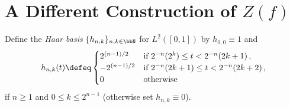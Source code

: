 \documentclass[../../../Master/AppliedStochastics.tex]{subfiles}
\author{Joe}
\date{01 October 2018}
\begin{document}
%


\makelecture


\section{A Different Construction of \texorpdfstring{$Z(f)$}{Z(f)}}


\begin{definition}
Define the \emph{Haar basis} $\{h_{n, k}\}_{n, k \in \bbN}$ for $L^2([0,1])$ by
    $h_{0, 0} \equiv 1$ and
\begin{equation*}
    h_{n, k}(t) \defeq \begin{cases}
        2^{(n-1)/2}     &\text{if }
            2^{- n} (2^k) \leq t < 2^{-n}(2k+1)\,,\\
        - 2^{(n-1)/2}   &\text{if }
            2^{-n} (2k+1) \leq t < 2^{- n} (2k+2)\,,\\
        0               &\text{otherwise}
                       \end{cases}
\end{equation*}
    if $n \geq 1$ and $0 \leq k \leq 2^{n-1}$
        (otherwise set $h_{n, k} \equiv 0$).
\end{definition}
\end{document}
